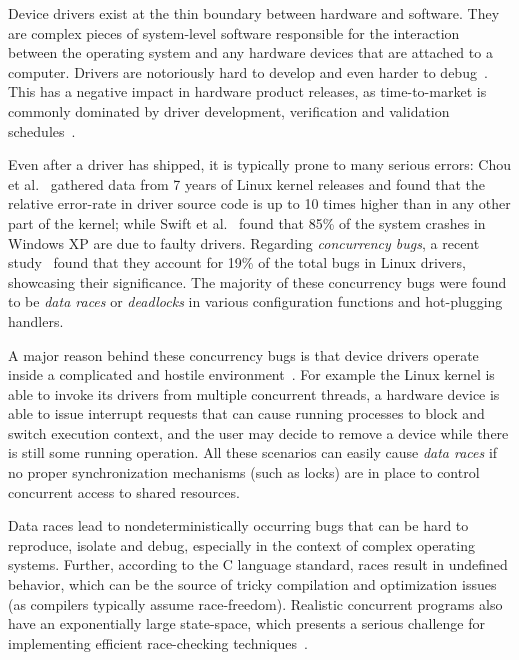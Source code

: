 Device drivers exist at the thin boundary between hardware and software. They are complex pieces of system-level software responsible for the interaction between the operating system and any hardware devices that are attached to a computer. Drivers are notoriously hard to develop and even harder to debug~\cite{corbet2005linux}. This has a negative impact in hardware product releases, as time-to-market is commonly dominated by driver development, verification and validation schedules~\cite{yavatkar2012era}.

Even after a driver has shipped, it is typically prone to many serious errors: Chou et al.~\cite{chou2001empirical} gathered data from 7 years of Linux kernel releases and found that the relative error-rate in driver source code is up to 10 times higher than in any other part of the kernel; while Swift et al.~\cite{Swift2003windowsxp} found that 85\% of the system crashes in Windows XP are due to faulty drivers. Regarding \emph{concurrency bugs}, a recent study~\cite{ryzhyk2009dingo} found that they account for 19\% of the total bugs in Linux drivers, showcasing their significance. The majority of these concurrency bugs were found to be \emph{data races} or \emph{deadlocks} in various configuration functions and hot-plugging handlers.

A major reason behind these concurrency bugs is that device drivers operate inside a complicated and hostile environment~\cite{corbet2005linux}. For example the Linux kernel is able to invoke its drivers from multiple concurrent threads, a hardware device is able to issue interrupt requests that can cause running processes to block and switch execution context, and the user may decide to remove a device while there is still some running operation. All these scenarios can easily cause \emph{data races} if no proper synchronization mechanisms (such as locks) are in place to control concurrent access to shared resources.

Data races lead to nondeterministically occurring bugs that can be hard to reproduce, isolate and debug, especially in the context of complex operating systems. Further, according to the C language standard, races result in undefined behavior, which can be the source of tricky compilation and optimization issues (as compilers typically assume race-freedom). Realistic concurrent programs also have an exponentially large state-space, which presents a serious challenge for implementing efficient race-checking techniques~\cite{musuvathi2008finding}.

